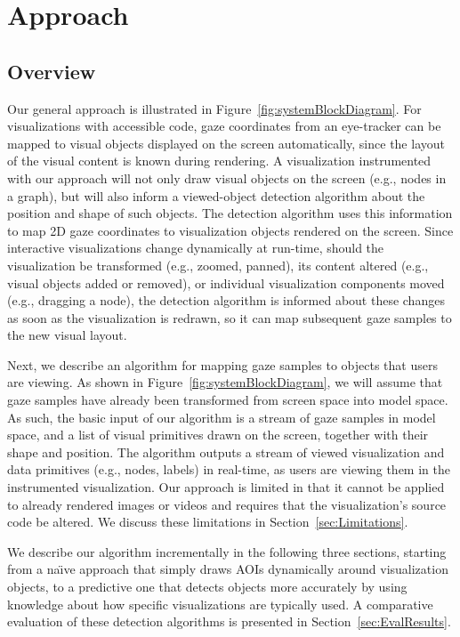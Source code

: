 ﻿\section{Approach}\label{sec:Approach}

\subsection{Overview}
Our general approach is illustrated in Figure~\ref{fig:systemBlockDiagram}. For visualizations with accessible code, gaze coordinates from an eye-tracker can be mapped to visual objects displayed on the screen automatically, since the layout of the visual content is known during rendering.  A visualization instrumented with our approach will not only draw visual objects on the screen (e.g., nodes in a graph), but will also inform a viewed-object detection algorithm about the position and shape of such objects. The detection algorithm uses this information to map 2D gaze coordinates to visualization objects rendered on the screen. Since interactive visualizations change dynamically at run-time, should the visualization be transformed (e.g., zoomed, panned), its content altered (e.g., visual objects added or removed), or individual visualization components moved (e.g., dragging a node), the detection algorithm is informed about these changes as soon as the visualization is redrawn, so it can map subsequent gaze samples to the new visual layout.

Next, we describe an algorithm for mapping gaze samples to objects that users are viewing. As shown in Figure~\ref{fig:systemBlockDiagram}, we will assume that gaze samples have already been transformed from screen space into model space. As such, the basic input of our algorithm is a stream of gaze samples in model space, and a list of visual primitives drawn on the screen, together with their shape and position. The algorithm outputs a stream of viewed visualization and data primitives (e.g., nodes, labels) in real-time, as users are viewing them in the instrumented visualization. Our approach is limited in that it cannot be applied to already rendered images or videos and requires that the visualization's source code be altered. We discuss these limitations in Section~\ref{sec:Limitations}.

We describe our algorithm incrementally in the following three sections, starting from a na\"{\i}ve approach that simply draws AOIs dynamically around visualization objects, to a predictive one that detects objects more accurately by using knowledge about how specific visualizations are typically used.  A comparative evaluation of these detection algorithms is presented in Section~\ref{sec:EvalResults}.


